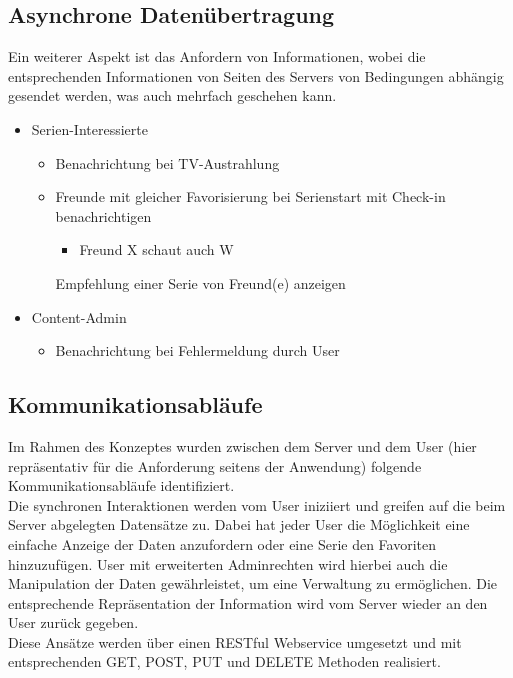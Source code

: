 \subsection{Asynchrone Datenübertragung}

Ein weiterer Aspekt ist das Anfordern von Informationen, wobei die entsprechenden Informationen von Seiten des Servers von Bedingungen abhängig gesendet werden, was auch mehrfach geschehen kann.

\begin{itemize}
\item
Serien-Interessierte
  \begin{itemize}
  \item
    Benachrichtung bei TV-Austrahlung
    \item
    Freunde mit gleicher Favorisierung bei Serienstart mit Check-in benachrichtigen
      \begin{itemize}
      \item
         Freund X schaut auch W
         \end{itemize}
    Empfehlung einer Serie von Freund(e) anzeigen
    \end{itemize}
\item
Content-Admin
  \begin{itemize}
  \item
    Benachrichtung bei Fehlermeldung durch User
    \end{itemize}
\end{itemize}

\subsection{Kommunikationsabläufe}
Im Rahmen des Konzeptes wurden zwischen dem Server und dem User (hier repräsentativ für die Anforderung seitens der Anwendung) folgende Kommunikationsabläufe identifiziert.\\
Die synchronen Interaktionen werden vom User iniziiert und greifen auf die beim Server abgelegten Datensätze zu. Dabei hat jeder User die Möglichkeit eine einfache Anzeige der Daten anzufordern oder eine Serie den Favoriten hinzuzufügen. User mit erweiterten Adminrechten wird hierbei auch die Manipulation der Daten gewährleistet, um eine Verwaltung zu ermöglichen. Die entsprechende Repräsentation der Information wird vom Server wieder an den User zurück gegeben.\\
Diese Ansätze werden über einen RESTful Webservice umgesetzt und mit entsprechenden GET, POST, PUT und DELETE Methoden realisiert.

